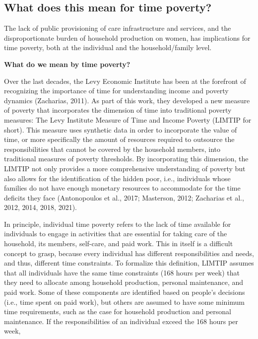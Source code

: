\documentclass[
  11pt,
]{article}
\begin{document}
\subsection{What does this mean for time
poverty?}\label{what-does-this-mean-for-time-poverty}

The lack of public provisioning of care infrastructure and services, and
the disproportionate burden of household production on women, has
implications for time poverty, both at the individual and the
household/family level.

\textbf{What do we mean by time poverty?}

Over the last decades, the Levy Economic Institute has been at the
forefront of recognizing the importance of time for understanding income
and poverty dynamics (Zacharias, 2011). As part of this work, they
developed a new measure of poverty that incorporates the dimension of
time into traditional poverty measures: The Levy Institute Measure of
Time and Income Poverty (LIMTIP for short). This measure uses synthetic
data in order to incorporate the value of time, or more specifically the
amount of resources required to outsource the responsibilities that
cannot be covered by the household members, into traditional measures of
poverty thresholds. By incorporating this dimension, the LIMTIP not only
provides a more comprehensive understanding of poverty but also allows
for the identification of the hidden poor, i.e., individuals whose
families do not have enough monetary resources to accommodate for the
time deficits they face (Antonopoulos et al., 2017; Masterson, 2012;
Zacharias et al., 2012, 2014, 2018, 2021).

In principle, individual time poverty refers to the lack of time
available for individuals to engage in activities that are essential for
taking care of the household, its members, self-care, and paid work.
This in itself is a difficult concept to grasp, because every individual
has different responsibilities and needs, and thus, different time
constraints. To formalize this definition, LIMTIP assumes that all
individuals have the same time constraints (168 hours per week) that
they need to allocate among household production, personal maintenance,
and paid work. Some of these components are identified based on people's
decisions (i.e., time spent on paid work), but others are assumed to
have some minimum time requirements, such as the case for household
production and personal maintenance. If the responsibilities of an
individual exceed the 168 hours per week,
\end{document}
